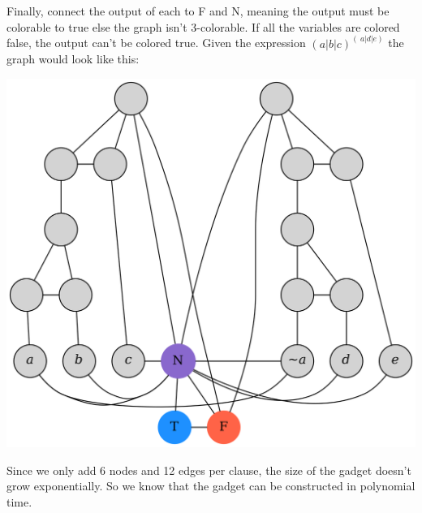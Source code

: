 \documentclass[12pt, letterpaper]{article}
\begin{document}
		Finally, connect the output of each to F and N, meaning the output must be colorable to true else the graph isn't 3-colorable.
		If all the variables are colored false, the output can't be colored true. 
		Given the expression $(a|b|c)^(~a|d|e)$ the graph would look like this:

		\begin{center}
		\includegraphics[width=\textwidth]{./gad.png}
		\end{center}

		Since we only add 6 nodes and 12 edges per clause, the size of the gadget doesn't grow exponentially. So we know that the gadget can be constructed in polynomial time.
\end{document}
